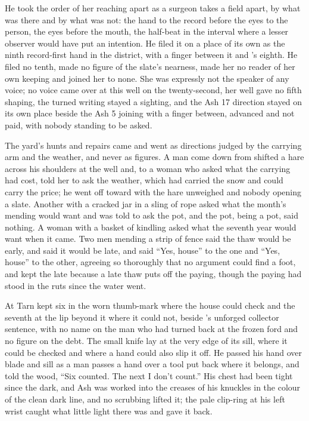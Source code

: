 He took the order of her reaching apart as a surgeon takes a field apart, by what was there and by what was not: the hand to the record before the eyes to the person, the eyes before the mouth, the half-beat in the interval where a lesser observer would have put an intention. He filed it on a place of its own as the ninth record-first hand in the district, with a finger between it and ’s eighth. He filed no tenth, made no figure of the slate’s nearness, made her no reader of her own keeping and joined her to none. She was expressly not the speaker of any voice; no voice came over  at this well on the twenty-second, her well gave no fifth shaping, the turned writing stayed a sighting, and the Ash 17 direction stayed on its own place beside the Ash 5 joining with a finger between, advanced and not paid, with nobody standing to be asked.

The yard’s hunts and repairs came and went as directions judged by the carrying arm and the weather, and never as figures. A man come down from  shifted a hare across his shoulders at the well and, to a woman who asked what the carrying had cost, told her to ask the weather, which had carried the snow and could carry the price; he went off toward  with the hare unweighed and nobody opening a slate. Another with a cracked jar in a sling of rope asked what the month’s mending would want and was told to ask the pot, and the pot, being a pot, said nothing. A woman with a basket of kindling asked what the seventh year would want when it came. Two men mending a strip of fence said the thaw would be early, and said it would be late, and  said “Yes, house” to the one and “Yes, house” to the other, agreeing so thoroughly that no argument could find a foot, and kept the late because a late thaw puts off the paying, though the paying had stood in the ruts since the water went.

\scenebreak

At  Tarn kept six in the worn thumb-mark where the house could check and the seventh at the lip beyond it where it could not, beside ’s unforged collector sentence, with no name on the man who had turned back at the frozen ford and no figure on the debt. The small knife lay at the very edge of its sill, where it could be checked and where a hand could also slip it off. He passed his hand over blade and sill as a man passes a hand over a tool put back where it belongs, and told the wood, “Six counted. The next I don’t count.” His chest had been tight since the dark, and Ash was worked into the creases of his knuckles in the colour of the clean dark line, and no scrubbing lifted it; the pale clip-ring at his left wrist caught what little light there was and gave it back.

